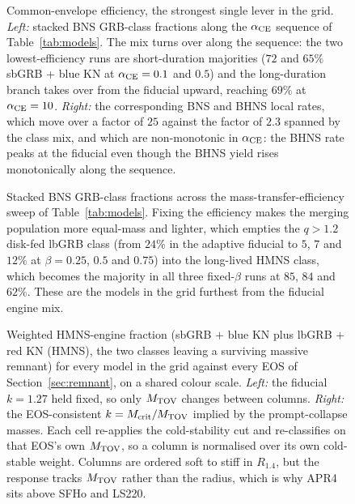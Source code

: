 \documentclass[twocolumn,apj]{openjournal}
\newcommand{\Mtov}{M_{\rm TOV}}
\begin{document}
\begin{figure}[!tbp]
\caption{Common-envelope efficiency, the strongest single lever in the grid.
\textit{Left:} stacked BNS GRB-class fractions along the $\alpha_{\rm CE}$
sequence of Table~\ref{tab:models}. The mix turns over along the sequence: the
two lowest-efficiency runs are short-duration majorities ($72$ and $65\%$
sbGRB + blue KN at $\alpha_{\rm CE} = 0.1$ and $0.5$) and the long-duration
branch takes over from the fiducial upward, reaching $69\%$ at
$\alpha_{\rm CE} = 10$.
\textit{Right:} the corresponding BNS and BHNS local rates, which move over a
factor of $25$ against the factor of $2.3$ spanned by the class mix, and which
are non-monotonic in $\alpha_{\rm CE}$: the BHNS rate peaks at the fiducial
even though the BHNS yield rises monotonically along the sequence.
\label{fig:alphace5}}
\end{figure}

\begin{figure}[!tbp]
\caption{Stacked BNS GRB-class fractions across the mass-transfer-efficiency
sweep of Table~\ref{tab:models}. Fixing the efficiency makes the merging
population more equal-mass and lighter, which empties the $q > 1.2$ disk-fed
lbGRB class (from $24\%$ in the adaptive fiducial to $5$, $7$ and $12\%$ at
$\beta = 0.25$, $0.5$ and $0.75$) into the long-lived HMNS class, which becomes
the majority in all three fixed-$\beta$ runs at $85$, $84$ and $62\%$. These are
the models in the grid furthest from the fiducial engine mix.
\label{fig:betasweep}}
\end{figure}

\begin{figure}[!tbp]
\caption{Weighted HMNS-engine fraction (sbGRB $+$ blue KN plus lbGRB $+$ red KN
(HMNS), the two classes leaving a surviving massive remnant) for every model in
the grid against every EOS of Section~\ref{sec:remnant}, on a shared colour
scale. \textit{Left:} the fiducial $k = 1.27$ held fixed, so only $\Mtov$
changes between columns. \textit{Right:} the EOS-consistent
$k = M_{\rm crit}/\Mtov$ implied by the \citet{bauswein2013} prompt-collapse
masses. Each cell re-applies the cold-stability cut and re-classifies on that
EOS's own $\Mtov$, so a column is normalised over its own cold-stable weight.
Columns are ordered soft to stiff in $R_{1.4}$, but the response tracks $\Mtov$
rather than the radius, which is why APR4 sits above SFHo and LS220.
\label{fig:eosmatrix}}
\end{figure}
\end{document}
